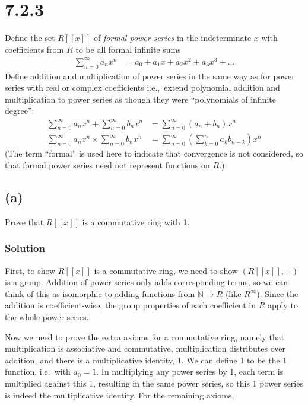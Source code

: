 \documentclass[fleqn]{article}
\begin{document}
    \section{7.2.3}
    Define the set $R[[x]]$ of \textit{formal power series} in the indeterminate $x$ with coefficients from $R$ to be all formal infinite sums
    \begin{align}
        \sum\limits_{n = 0}^{\infty} a_n x^n &= a_0 + a_1 x + a_2 x^2 + a_3 x^3 + ...
    \end{align}
    Define addition and multiplication of power series in the same way as for power series with real or complex coefficients i.e.,\ extend polynomial addition and multiplication to power series as though they were ``polynomials of infinite degree'':
    \begin{align}
        \sum\limits_{n = 0}^{\infty} a_n x^n + \sum\limits_{n = 0}^{\infty} b_n x^n &= \sum\limits_{n = 0}^{\infty} (a_n + b_n) x^n \\
        \sum\limits_{n = 0}^{\infty} a_n x^n \times \sum\limits_{n = 0}^{\infty} b_n x^n &= \sum\limits_{n = 0}^{\infty} \left(\sum\limits_{k = 0}^{n} a_k b_{n - k}\right) x^n
    \end{align}
    (The term ``formal'' is used here to indicate that convergence is not considered, so that formal power series need not represent functions on $R$.)
        
        \subsection{(a)}
        Prove that $R[[x]]$ is a commutative ring with 1.
            
            \subsubsection{Solution}
            First, to show $R[[x]]$ is a commutative ring, we need to show $(R[[x]], +)$ is a group.  Addition of power series only adds corresponding terms, so we can think of this as isomorphic to adding functions from $\mathbb{N} \to R$ (like $R^\infty$).  Since the addition is coefficient-wise, the group properties of each coefficient in $R$ apply to the whole power series.
            
            Now we need to prove the extra axioms for a commutative ring, namely that multiplication is associative and commutative, multiplication distributes over addition, and there is a multiplicative identity, 1.  We can define 1 to be the 1 function, i.e.\ with $a_0 = 1$.  In multiplying any power series by 1, each term is multiplied against this 1, resulting in the same power series, so this 1 power series is indeed the multiplicative identity.  For the remaining axioms, \\
            
\end{document}
